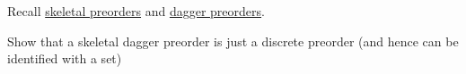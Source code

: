 
Recall \href{doc/1 math/Seven Sketches in Compositionality/1 Chapter 1: Generative Effects/3 Preorders/Skeletality}{skeletal preorders} and \href{doc/1 math/Seven Sketches in Compositionality/1 Chapter 1: Generative Effects/4 Monotone maps/2 Dagger preorder}{dagger preorders}.

Show that a skeletal dagger preorder is just a discrete preorder (and hence can be identified with a set)